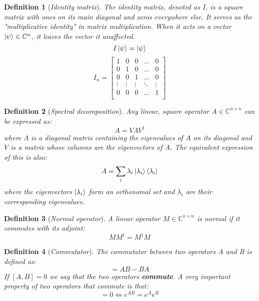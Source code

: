 \documentclass[12pt,a4paper]{report}
\newtheorem{definition}{Definition}
\begin{document}
\begin{definition}[\emph{Identity matrix}]
The identity matrix, denoted as \(I\), is a square matrix with ones on its main diagonal and zeros everywhere else. It serves as the "multiplicative identity" in matrix multiplication. When it acts on a vector $\ket{\psi} \in \mathbb{C}^n$, it leaves the vector it unaffected.
\begin{equation}
    \mathit{I} \ket{\psi} =  \ket{\psi} 
\end{equation}
 \begin{equation}
I_n = 
\begin{bmatrix}
1 & 0 & 0 & \dots & 0 \\
0 & 1 & 0 & \dots & 0 \\
0 & 0 & 1 & \dots & 0 \\
\vdots & \vdots & \vdots & \ddots & \vdots \\
0 & 0 & 0 & \dots & 1 \\
\end{bmatrix}
\end{equation}
\end{definition}

\begin{definition}[\emph{Spectral decomposition}]
Any linear, square operator $A \in \mathbb{C}^{n \times n}$ can be expressed as:
\begin{equation}
    A = V \Lambda V^\dagger
\end{equation}
where \(\Lambda\) is a diagonal matrix containing the eigenvalues of \(A\) on its diagonal and \(V\) is a matrix whose columns are the eigenvectors of \(A\). The equivalent expression of this is also:
\begin{equation}
    A = \sum_i \lambda_i \ket{\lambda_i} \bra{\lambda_i}
\end{equation}
where the eigenvectors $\ket{\lambda_i}$ form an orthonomal set and $\lambda_i$ are their corresponding eigenvalues.
\end{definition}

\begin{definition}[\emph{Normal operator}]
A linear operator $M \in \mathbb{C}^{n \times n}$ is normal if it commutes with its adjoint:
\begin{equation}
    M M^{\dagger} = M^{\dagger}M
\end{equation}
\end{definition}

\begin{definition}[\emph{Commutator}]
The commutator between two operators A and B is defined as: 
\begin{equation}
    [A,B] = AB - BA
\end{equation}
If $[A,B] = 0$ we say that the two operators \textbf{commute}. A very important property of two operators that commute is that:
\begin{equation}
    [A, B] = 0 \iff e^{AB} = e^A e^B
\end{equation}
\end{definition}
\end{document}
